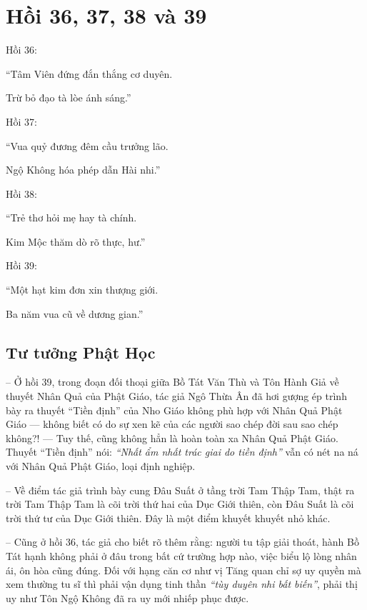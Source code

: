 \chapter{Hồi 36, 37, 38 và 39} %
\label{cha:hoi_36_37}

Hồi 36:

\begin{itshape}
``Tâm Viên đứng đắn thắng cơ duyên.

Trừ bỏ đạo tà lòe ánh sáng.''
\end{itshape}

Hồi 37:

\begin{itshape}
``Vua quỷ đương đêm cầu trưởng lão.

Ngộ Không hóa phép dẫn Hài nhi.''
\end{itshape}

Hồi 38:

\begin{itshape}
``Trẻ thơ hỏi mẹ hay tà chính.

Kim Mộc thăm dò rõ thực, hư.''
\end{itshape}

Hồi 39:

\begin{itshape}
``Một hạt kim đơn xin thượng giới.

Ba năm vua cũ về dương gian.''
\end{itshape}

\section{Tư tưởng Phật Học} %
\label{sec:36_37_phat_hoc}

-- Ở hồi 39, trong đoạn đối thoại giữa Bồ Tát Văn Thù và Tôn Hành Giả về thuyết Nhân Quả của Phật Giáo, tác giả Ngô Thừa Ân đã hơi gượng ép trình bày ra thuyết ``Tiền định'' của Nho Giáo không phù hợp với Nhân Quả Phật Giáo --- không biết có do sự xen kẽ của các người sao chép đời sau sao chép không?! --- Tuy thế, cũng không hẳn là hoàn toàn xa Nhân Quả Phật Giáo. Thuyết ``Tiền định'' nói: \emph{``Nhất ẩm nhất trác giai do tiền định''} vẫn có nét na ná với Nhân Quả Phật Giáo, loại định nghiệp.

-- Về điểm tác giả trình bày cung Đâu Suất ở tầng trời Tam Thập Tam, thật ra trời Tam Thập Tam là cõi trời thứ hai của Dục Giới thiên, còn Đâu Suất là cõi trời thứ tư của Dục Giới thiên. Đây là một điểm khuyết khuyết nhỏ khác.

-- Cũng ở hồi 36, tác giả cho biết rõ thêm rằng: người tu tập giải thoát, hành Bồ Tát hạnh không phải ở đâu trong bất cứ trường hợp nào, việc biểu lộ lòng nhân ái, ôn hòa cũng đúng. Đối với hạng căn cơ như vị Tăng quan chỉ sợ uy quyền mà xem thường tu sĩ thì phải vận dụng tinh thần \emph{``tùy duyên nhi bất biến''}, phải thị uy như Tôn Ngộ Không đã ra uy mới nhiếp phục được.

